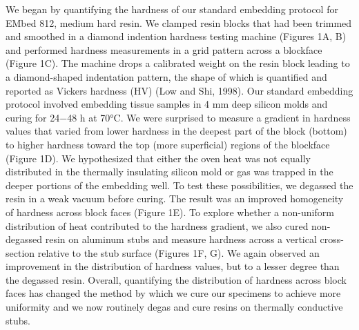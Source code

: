 \documentclass{article}
\begin{document}
We began by quantifying the hardness of our standard embedding protocol for EMbed 812, medium hard resin. We clamped resin blocks that had been trimmed and smoothed in a diamond indention hardness testing machine (Figures 1A, B) and performed hardness measurements in a grid pattern across a blockface (Figure 1C). The machine drops a calibrated weight on the resin block leading to a diamond-shaped indentation pattern, the shape of which is quantified and reported as Vickers hardness (HV) (Low and Shi, 1998). Our standard embedding protocol involved embedding tissue samples in 4 mm deep silicon molds and curing for 24−48 h at 70°C. We were surprised to measure a gradient in hardness values that varied from lower hardness in the deepest part of the block (bottom) to higher hardness toward the top (more superficial) regions of the blockface (Figure 1D). We hypothesized that either the oven heat was not equally distributed in the thermally insulating silicon mold or gas was trapped in the deeper portions of the embedding well. To test these possibilities, we degassed the resin in a weak vacuum before curing. The result was an improved homogeneity of hardness across block faces (Figure 1E). To explore whether a non-uniform distribution of heat contributed to the hardness gradient, we also cured non-degassed resin on aluminum stubs and measure hardness across a vertical cross-section relative to the stub surface (Figures 1F, G). We again observed an improvement in the distribution of hardness values, but to a lesser degree than the degassed resin. Overall, quantifying the distribution of hardness across block faces has changed the method by which we cure our specimens to achieve more uniformity and we now routinely degas and cure resins on thermally conductive stubs.
\end{document}
